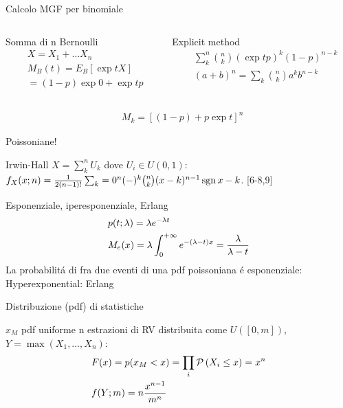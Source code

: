 \begin{wordonframe}{Calcolo MGF per binomiale}
\begin{columns}[T]
\begin{column}{0.5\textwidth}
\begin{block}{Somma di n Bernoulli}
\begin{align*}
&X=X_1+\ldots X_n\\
&M_B(t)=E_B[\exp{tX}]\\
&=(1-p)\exp{0}+\exp{t}p
\end{align*}
\end{block}
\end{column}
\begin{column}{0.5\textwidth}
\begin{block}{Explicit method}
\begin{align*}
&\sum_k^n\binom{n}{k}(\exp{t}p)^k(1-p)^{n-k}\\
&(a+b)^n=\sum_k\binom{n}{k}a^kb^{n-k}
\end{align*}
\end{block}
\end{column}
\end{columns}
\begin{align*}
&M_k=[(1-p)+p\exp{t}]^n
\end{align*}
\end{wordonframe}

\begin{wordonframe}{Poissoniane!}

\end{wordonframe}

\begin{frame}{Irwin-Hall}
$X=\sum_k^nU_k$ dove $U_i\in U(0,1)$: $f_X(x;n)=\frac{1}{2(n-1)!}\sum_k=0^n(-)^k\binom{n}{k}(x-k)^{n-1}\operatorname{sgn}{x-k}$.
[6-8,9]
    
\end{frame}

\begin{frame}{Esponenziale, iperesponenziale, Erlang}
\begin{align*}
&p(t;\lambda)=\lambda e^{-\lambda t}\\
&M_e(x)=\lambda\int_{0}^{+\infty}{}e^{-(\lambda-t)x}=\frac{\lambda}{\lambda-t}
\end{align*}
La probabilit\'a di fra due eventi di una pdf poissoniana \'e esponenziale: 
Hyperexponential:
Erlang
\end{frame}

\begin{frame}{Distribuzione (pdf) di statistiche}
\begin{block}{$x_M$ pdf uniforme}
n estrazioni di RV distribuita come $U([0,m])$, $Y=\max{(X_1,\ldots,X_n)}$:
\begin{align*}
&F(x)=p(x_M<x)=\prod_i\operatorname{\mathcal{P}}{(X_i\leq x)}=x^n\\
&f(Y;m)=n\frac{x^{n-1}}{m^n}
\end{align*}
\end{block}
\end{frame}

